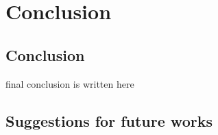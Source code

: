 \chapter{Conclusion}
\label{chapter:results}

\section{Conclusion}
final conclusion is written here
\section{Suggestions for future works}